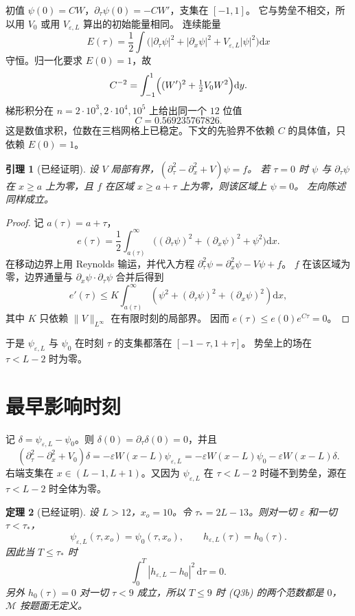 \documentclass[11pt]{ctexart}
\newtheorem{theorem}{定理}
\newtheorem{lemma}[theorem]{引理}
\theoremstyle{definition}
\theoremstyle{remark}
\newcommand{\eps}{\varepsilon}
\newcommand{\rd}{\mathrm{d}}
\newcommand{\cM}{\mathcal M}
\begin{document}
初值 $\psi(0)=CW$，$\partial_\tau\psi(0)=-CW'$，支集在 $[-1,1]$。
它与势垒不相交，所以用 $V_0$ 或用 $V_{\eps,L}$ 算出的初始能量相同。
连续能量
\[
E(\tau)=\frac12\int\bigl(|\partial_\tau\psi|^2+|\partial_x\psi|^2+V_{\eps,L}|\psi|^2\bigr)\rd x
\]
守恒。归一化要求 $E(0)=1$，故
\[
C^{-2}=\int_{-1}^{1}\Bigl((W')^2+\tfrac12 V_0 W^2\Bigr)\rd y.
\]
梯形积分在 $n=2\cdot10^3,2\cdot10^4,10^5$ 上给出同一个 $12$ 位值
\[
C=0.569235767826.
\]
这是数值求积，位数在三档网格上已稳定。下文的先验界不依赖 $C$ 的具体值，只依赖 $E(0)=1$。

\begin{lemma}[已经证明]
\label{lem:speed}
设 $V$ 局部有界，$(\partial_\tau^2-\partial_x^2+V)\psi=f$。
若 $\tau=0$ 时 $\psi$ 与 $\partial_\tau\psi$ 在 $x\ge a$ 上为零，且 $f$ 在区域 $x\ge a+\tau$ 上为零，则该区域上 $\psi=0$。
左向陈述同样成立。
\end{lemma}

\begin{proof}
记 $a(\tau)=a+\tau$，
\[
e(\tau)=\frac12\int_{a(\tau)}^\infty\bigl((\partial_\tau\psi)^2+(\partial_x\psi)^2+\psi^2\bigr)\rd x.
\]
在移动边界上用 Reynolds 输运，并代入方程 $\partial_\tau^2\psi=\partial_x^2\psi-V\psi+f$。
$f$ 在该区域为零，边界通量与 $\partial_x\psi\cdot\partial_\tau\psi$ 合并后得到
\[
e'(\tau)\le K\int_{a(\tau)}^\infty(\psi^2+(\partial_\tau\psi)^2+(\partial_x\psi)^2)\rd x,
\]
其中 $K$ 只依赖 $\|V\|_{L^\infty}$ 在有限时刻的局部界。
因而 $e(\tau)\le e(0)e^{C\tau}=0$。
\end{proof}

于是 $\psi_{\eps,L}$ 与 $\psi_0$ 在时刻 $\tau$ 的支集都落在 $[-1-\tau,1+\tau]$。
势垒上的场在 $\tau<L-2$ 时为零。

\section{最早影响时刻}
\label{sec:causal}

记 $\delta=\psi_{\eps,L}-\psi_0$。则 $\delta(0)=\partial_\tau\delta(0)=0$，并且
\begin{equation}
\label{eq:duhamel}
(\partial_\tau^2-\partial_x^2+V_0)\delta=-\eps W(x-L)\psi_{\eps,L}
=-\eps W(x-L)\psi_0-\eps W(x-L)\delta.
\end{equation}
右端支集在 $x\in(L-1,L+1)$。又因为 $\psi_{\eps,L}$ 在 $\tau<L-2$ 时碰不到势垒，源在 $\tau<L-2$ 时全体为零。

\begin{theorem}[已经证明]
\label{thm:causal}
设 $L>12$，$x_o=10$。令 $\tau_*=2L-13$。则对一切 $\eps$ 和一切 $\tau<\tau_*$，
\[
\psi_{\eps,L}(\tau,x_o)=\psi_0(\tau,x_o),\qquad
h_{\eps,L}(\tau)=h_0(\tau).
\]
因此当 $T\le\tau_*$ 时
\[
\int_0^T|h_{\eps,L}-h_0|^2\,\rd\tau=0.
\]
另外 $h_0(\tau)=0$ 对一切 $\tau<9$ 成立，所以 $T\le9$ 时 (Q3b) 的两个范数都是 $0$，$\cM$ 按题面无定义。
\end{theorem}
\end{document}
